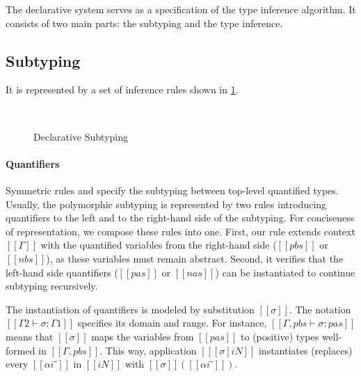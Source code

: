 \label{sec:declarative-system}

The declarative system serves as a specification of the
type inference algorithm. It consists of two main parts:
the subtyping and the type inference. 

\subsection{Subtyping}
It is represented by a set of inference rules shown in
\cref{fig:declarative-subtyping}.

\begin{figure}[h]
  \begin{multicols}{2}
    \ottdefnDOneNsubLabeled{}

    \ottdefnDOnePsupLabeled{}
  \end{multicols}
  \hfill\\
  \begin{multicols}{2}
    \ottdefnDOneNeqLabeled{}

    \ottdefnDOnePeqLabeled{}
  \end{multicols}
  \caption{Declarative Subtyping}
  \label{fig:declarative-subtyping}
\end{figure}

\paragraph{Quantifiers}  
Symmetric rules  and 
 specify 
the subtyping between top-level quantified types.
Usually, the polymorphic subtyping is represented by two rules
introducing quantifiers to the left and to the right-hand side of the subtyping.
For conciseness of representation, we compose these rules into one.
First, our rule extends context $[[Γ]]$ with the quantified variables 
from the right-hand side ($[[pbs]]$ or $[[nbs]]$), 
as these variables must remain abstract.
Second, it verifies that the left-hand side quantifiers
($[[pas]]$ or $[[nas]]$) can be instantiated to continue subtyping recursively. 

The instantiation of quantifiers is modeled by substitution $[[σ]]$.
The notation $[[Γ2 ⊢ σ : Γ1]]$ specifies its domain and range.
For instance, $[[Γ, pbs ⊢ σ : {pas}]]$ means that 
$[[σ]]$ maps the variables from $[[pas]]$ to (positive) types
well-formed in $[[Γ, pbs]]$.
This way, application $[[ [σ]iN ]]$ instantiates (replaces) every
$[[αi⁻]]$ in $[[iN]]$ with $[[σ]]([[αi⁻]])$.


